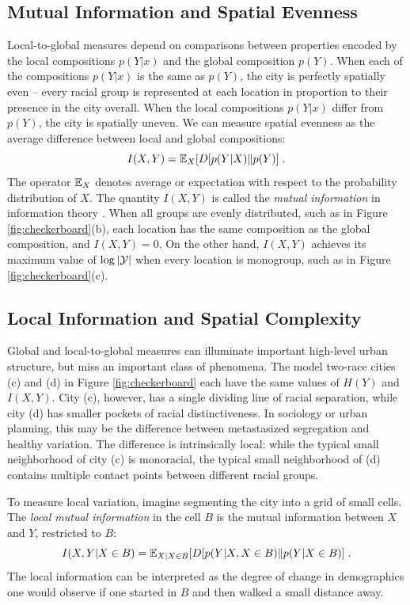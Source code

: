 \documentclass[9pt,twocolumn,twoside]{pnas-new}
\begin{document}
\subsection*{Mutual Information and Spatial Evenness}
	Local-to-global measures depend on comparisons between properties encoded by the local compositions $p(Y|x)$ and the global composition $p(Y)$. 
	When each of the compositions $p(Y|x)$ is the same as $p(Y)$, the city is perfectly spatially even -- every racial group is represented at each location in proportion to their presence in the city overall. 
	When the local compositions $p(Y|x)$ differ from $p(Y)$, the city is spatially uneven. 
	We can measure spatial evenness as the average difference between local and global compositions: 
	\begin{equation}
		I(X,Y) = \mathbb{E}_X[D[p(Y|X)\|p(Y)]\;.
	\end{equation}
	The operator $\mathbb{E}_X$ denotes average or expectation with respect to the probability distribution of $X$. 
	The quantity $I(X,Y)$ is called the \emph{mutual information} in information theory \cite{Cover1991,Csiszzr2004,Bettencourt2015}.  
	When all groups are evenly distributed, such as in Figure \ref{fig:checkerboard}(b), each location has the same composition as the global composition, and $I(X,Y) = 0$. 
	On the other hand, $I(X,Y)$ achieves its maximum value of $\log \left|\mathcal{Y}\right|$ when every location is monogroup, such as in Figure \ref{fig:checkerboard}(c). 

\subsection*{Local Information and Spatial Complexity}
	
	Global and local-to-global measures can illuminate important high-level urban structure, but miss an important class of phenomena. 
	The model two-race cities (c) and (d) in Figure \ref{fig:checkerboard} each have the same values of $H(Y)$ and $I(X,Y)$. 
	City (c), however, has a single dividing line of racial separation, while city (d) has smaller pockets of racial distinctiveness. 
	In sociology or urban planning, this may be the difference between metastasized segregation and healthy variation. 
	The difference is intrinsically local: while the typical small neighborhood of city (c) is monoracial, the typical small neighborhood of (d) contains multiple contact points between different racial groups. 
 
	To measure local variation, imagine segmenting the city into a grid of small cells. 
	The \emph{local mutual information} in the cell $B$ is the mutual information between $X$ and $Y$, restricted to $B$:
	\begin{equation*}
		I(X,Y | X \in B) = \mathbb{E}_{X|X \in B}[D[p(Y|X,X\in B)\|p(Y|X\in B)]\;.
	\end{equation*}
	The local information can be interpreted as the degree of change in demographics one would observe if one started in $B$ and then walked a small distance away. 
\end{document}

